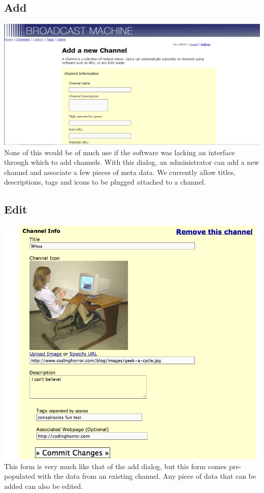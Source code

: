 \documentclass[a4paper,12pt]{report}
\begin{document}
\subsection{Add}
\includegraphics{images/channeladd.png}
None of this would be of much use if the software was lacking an interface through which to add channels.
With this dialog, an administrator can add a new channel and associate a few pieces of meta data.
We currently allow titles, descriptions, tags and icons to be plugged attached to a channel.

\subsection{Edit}
\includegraphics{images/channeledit.png}
This form is very much like that of the add dialog, but this form comes pre-populated with the data from an existing channel.
Any piece of data that can be added can also be edited.
\end{document}
